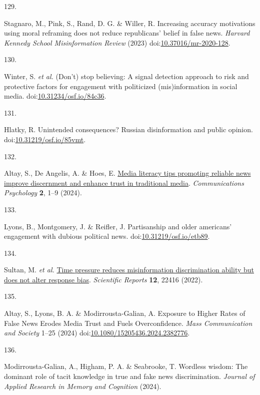 \documentclass[
  man]{apa6}
\newlength{\cslhangindent}
\newlength{\csllabelwidth}
\newenvironment{CSLReferences}[2] %
 {\begin{list}{}{%
  \setlength{\itemindent}{0pt}
  \setlength{\leftmargin}{0pt}
  \setlength{\parsep}{0pt}
  \ifodd #1
   \setlength{\leftmargin}{\cslhangindent}
   \setlength{\itemindent}{-1\cslhangindent}
  \fi
  \setlength{\itemsep}{#2\baselineskip}}}
 {\end{list}}
\newcommand{\CSLLeftMargin}[1]{\parbox[t]{\csllabelwidth}{\strut#1\strut}}
\newcommand{\CSLRightInline}[1]{\parbox[t]{\linewidth - \csllabelwidth}{\strut#1\strut}}
\begin{document}
\begin{CSLReferences}{0}{0}
\CSLLeftMargin{129. }%
\CSLRightInline{*Stagnaro, M., Pink, S., Rand, D. G. \& Willer, R. Increasing accuracy motivations using moral reframing does not reduce republicans{'} belief in false news. \emph{Harvard Kennedy School Misinformation Review} (2023) doi:\href{https://doi.org/10.37016/mr-2020-128}{10.37016/mr-2020-128}.}

\CSLLeftMargin{130. }%
\CSLRightInline{*Winter, S. \emph{et al.} (Don{'}t) stop believing: A signal detection approach to risk and protective factors for engagement with politicized (mis)information in social media. doi:\href{https://doi.org/10.31234/osf.io/84c36}{10.31234/osf.io/84c36}.}

\CSLLeftMargin{131. }%
\CSLRightInline{*Hlatky, R. Unintended consequences? Russian disinformation and public opinion. doi:\href{https://doi.org/10.31219/osf.io/85vmt}{10.31219/osf.io/85vmt}.}

\CSLLeftMargin{132. }%
\CSLRightInline{*Altay, S., De Angelis, A. \& Hoes, E. \href{https://doi.org/10.1038/s44271-024-00121-5}{Media literacy tips promoting reliable news improve discernment and enhance trust in traditional media}. \emph{Communications Psychology} \textbf{2}, 1--9 (2024).}

\CSLLeftMargin{133. }%
\CSLRightInline{*Lyons, B., Montgomery, J. \& Reifler, J. Partisanship and older americans{'} engagement with dubious political news. doi:\href{https://doi.org/10.31219/osf.io/etb89}{10.31219/osf.io/etb89}.}

\CSLLeftMargin{134. }%
\CSLRightInline{*Sultan, M. \emph{et al.} \href{https://doi.org/10.1038/s41598-022-26209-8}{Time pressure reduces misinformation discrimination ability but does not alter response bias}. \emph{Scientific Reports} \textbf{12}, 22416 (2022).}

\CSLLeftMargin{135. }%
\CSLRightInline{*Altay, S., Lyons, B. A. \& Modirrousta-Galian, A. Exposure to Higher Rates of False News Erodes Media Trust and Fuels Overconfidence. \emph{Mass Communication and Society} 1--25 (2024) doi:\href{https://doi.org/10.1080/15205436.2024.2382776}{10.1080/15205436.2024.2382776}.}

\CSLLeftMargin{136. }%
\CSLRightInline{*Modirrousta-Galian, A., Higham, P. A. \& Seabrooke, T. Wordless wisdom: The dominant role of tacit knowledge in true and fake news discrimination. \emph{Journal of Applied Research in Memory and Cognition} (2024).}

\end{CSLReferences}
\end{document}
